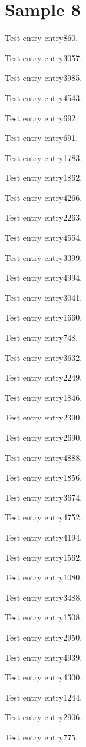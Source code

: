 \chapter{Sample 8}
Test entry \gls{entry860}.

Test entry \gls{entry3057}.

Test entry \gls{entry3985}.

Test entry \gls{entry4543}.

Test entry \gls{entry692}.

Test entry \gls{entry691}.

Test entry \gls{entry1783}.

Test entry \gls{entry1862}.

Test entry \gls{entry4266}.

Test entry \gls{entry2263}.

Test entry \gls{entry4554}.

Test entry \gls{entry3399}.

Test entry \gls{entry4994}.

Test entry \gls{entry3041}.

Test entry \gls{entry1660}.

Test entry \gls{entry748}.

Test entry \gls{entry3632}.

Test entry \gls{entry2249}.

Test entry \gls{entry1846}.

Test entry \gls{entry2390}.

Test entry \gls{entry2690}.

Test entry \gls{entry4888}.

Test entry \gls{entry1856}.

Test entry \gls{entry3674}.

Test entry \gls{entry4752}.

Test entry \gls{entry4194}.

Test entry \gls{entry1562}.

Test entry \gls{entry1080}.

Test entry \gls{entry3488}.

Test entry \gls{entry1508}.

Test entry \gls{entry2950}.

Test entry \gls{entry4939}.

Test entry \gls{entry4300}.

Test entry \gls{entry1244}.

Test entry \gls{entry2906}.

Test entry \gls{entry775}.

